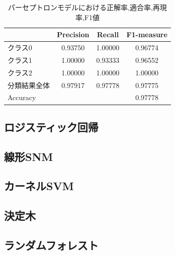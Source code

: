 \documentclass[twocolumn]{jarticle}     %
\begin{document}
\begin{table}[hbtp]
  \caption{パーセプトロンモデルにおける正解率,適合率,再現率,F1値}
  \label{table:パーセプトロン}
  \centering
  \begin{tabular}{lccc}
    \hline
     & Precision  &  Recall &  F1-measure \\
    \hline
    クラス0  & 0.93750  & 1.00000 & 0.96774 \\
    クラス1  & 1.00000  & 0.93333 & 0.96552 \\
    クラス2  & 1.00000  & 1.00000 & 1.00000 \\
    分類結果全体  &  0.97917  &  0.97778 & 0.97775 \\
    \hline
    Accuracy & & & 0.97778\\
    \hline
  \end{tabular}
\end{table}

\subsection*{ロジスティック回帰}

\subsection*{線形SNM}

\subsection*{カーネルSVM}

\subsection*{決定木}

\subsection*{ランダムフォレスト}









\end{document}
